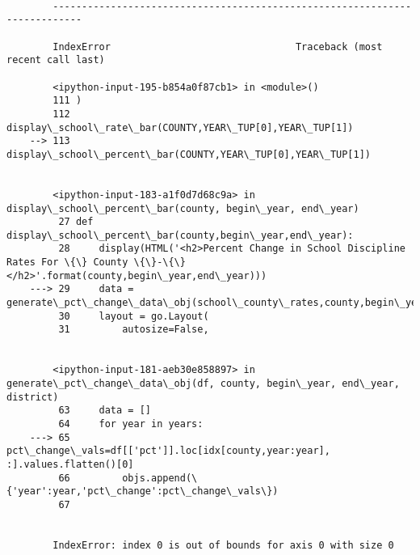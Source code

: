 \documentclass[11pt]{article}
\begin{document}
    
    \begin{Verbatim}[commandchars=\\\{\}]

        ---------------------------------------------------------------------------

        IndexError                                Traceback (most recent call last)

        <ipython-input-195-b854a0f87cb1> in <module>()
        111 )
        112 display\_school\_rate\_bar(COUNTY,YEAR\_TUP[0],YEAR\_TUP[1])
    --> 113 display\_school\_percent\_bar(COUNTY,YEAR\_TUP[0],YEAR\_TUP[1])
    

        <ipython-input-183-a1f0d7d68c9a> in display\_school\_percent\_bar(county, begin\_year, end\_year)
         27 def display\_school\_percent\_bar(county,begin\_year,end\_year):
         28     display(HTML('<h2>Percent Change in School Discipline Rates For \{\} County \{\}-\{\}</h2>'.format(county,begin\_year,end\_year)))
    ---> 29     data = generate\_pct\_change\_data\_obj(school\_county\_rates,county,begin\_year,end\_year)
         30     layout = go.Layout(
         31         autosize=False,


        <ipython-input-181-aeb30e858897> in generate\_pct\_change\_data\_obj(df, county, begin\_year, end\_year, district)
         63     data = []
         64     for year in years:
    ---> 65         pct\_change\_vals=df[['pct']].loc[idx[county,year:year], :].values.flatten()[0]
         66         objs.append(\{'year':year,'pct\_change':pct\_change\_vals\})
         67 


        IndexError: index 0 is out of bounds for axis 0 with size 0

    \end{Verbatim}
\end{document}
